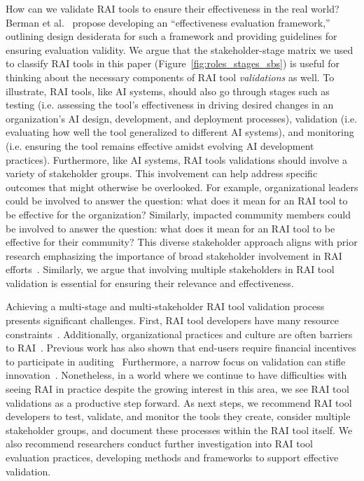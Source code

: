 How can we validate RAI tools to ensure their effectiveness in the real world? 
Berman et al.~\cite{berman2024scoping} propose developing an ``effectiveness evaluation framework,'' outlining design desiderata for such a framework and providing guidelines for ensuring evaluation validity.
We argue that the stakeholder-stage matrix we used to classify RAI tools in this paper (Figure~\ref{fig:roles_stages_sbs}) is useful for thinking about the necessary components of RAI tool \emph{validations} as well.
To illustrate, RAI tools, like AI systems, should also go through stages such as testing (i.e. assessing the tool's effectiveness in driving desired changes in an organization's AI design, development, and deployment processes), validation (i.e. evaluating how well the tool generalized to different AI systems), and monitoring (i.e. ensuring the tool remains effective amidst evolving AI development practices).
Furthermore, like AI systems, RAI tools validations should involve a variety of stakeholder groups. 
This involvement can help address specific outcomes that might otherwise be overlooked.
For example, organizational leaders could be involved to answer the question: what does it mean for an RAI tool to be effective for the organization? Similarly, impacted community members could be involved to answer the question: what does it mean for an RAI tool to be effective for their community?
This diverse stakeholder approach aligns with prior research emphasizing the importance of broad stakeholder involvement in RAI efforts~\cite{kaminski2018binary, kawakami2024responsible}. Similarly, we argue that involving multiple stakeholders in RAI tool validation is essential for ensuring their relevance and effectiveness. 

Achieving a multi-stage and multi-stakeholder RAI tool validation process presents significant challenges.
First, RAI tool developers have many resource constraints~\cite{berman2024scoping}.
Additionally, organizational practices and culture are often barriers to RAI~\cite{rakova2021responsible, varanasi2023currently}. Previous work has also shown that end-users require financial incentives to participate in auditing~\cite{deng2023understanding}
Furthermore, a narrow focus on validation can stifle innovation~\cite{greenberg2008usability}.
Nonetheless, in a world where we continue to have difficulties with seeing RAI in practice despite the growing interest in this area, we see RAI tool validations as a productive step forward.
As next steps, we recommend RAI tool developers to test, validate, and monitor the tools they create, consider multiple stakeholder groups, and document these processes within the RAI tool itself.
We also recommend researchers conduct further investigation into RAI tool evaluation practices, developing methods and frameworks to support effective validation.

